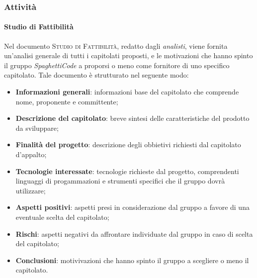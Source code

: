 \documentclass[../norme-di-progetto.tex]{subfiles}
\begin{document}
\subsubsection{Attività}
\paragraph{Studio di Fattibilità}
Nel documento \textsc{Studio di Fattibilità}, redatto dagli \emph{analisti}, viene fornita un'analisi generale di tutti i capitolati proposti, e le motivazioni che hanno spinto il gruppo \emph{SpaghettiCode} a proporsi o meno come fornitore di uno specifico capitolato. 
Tale documento è strutturato nel seguente modo:
\begin{itemize}
    \item \textbf{Informazioni generali}: informazioni base del capitolato che comprende nome, proponente e committente;
    \item \textbf{Descrizione del capitolato}: breve sintesi delle caratteristiche del prodotto da sviluppare;
    \item \textbf{Finalità del progetto}: descrizione degli obbietivi richiesti dal capitolato d'appalto;
    \item \textbf{Tecnologie interessate}: tecnologie richieste dal progetto, comprendenti linguaggi di progammazioni e strumenti specifici che il gruppo dovrà utilizzare;
    \item \textbf{Aspetti positivi}: aspetti presi in considerazione dal gruppo a favore di una eventuale scelta del capitolato;
    \item \textbf{Rischi}: aspetti negativi da affrontare individuate dal gruppo in caso di scelta del capitolato;  
    \item \textbf{Conclusioni}: motivivazioni che hanno spinto il gruppo a scegliere o meno il capitolato.
\end{itemize}
\end{document}

